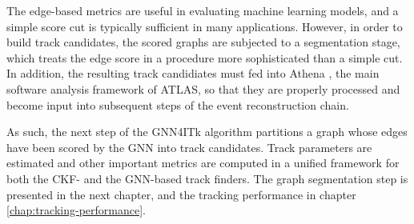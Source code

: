 The edge-based metrics are useful in evaluating machine learning models, and a simple score cut is typically sufficient in many applications. 
However, in order to build track candidates, the scored graphs are subjected to a segmentation stage, which 
treats the edge score in a procedure more sophisticated than a simple cut.
In addition, the resulting track candidiates must fed into Athena \cite{atlas_collaboration_2021_4772550}, the main software analysis framework of ATLAS, 
so that they are properly processed and become input into subsequent steps of the event reconstruction chain.

As such, the next step of the GNN4ITk algorithm partitions a graph whose edges have been scored by the GNN into track candidates. 
Track parameters are estimated and other important metrics are computed in a unified framework for both the CKF- and the GNN-based track finders.
The graph segmentation step is presented in the next chapter, and the tracking performance in chapter \ref{chap:tracking-performance}.

